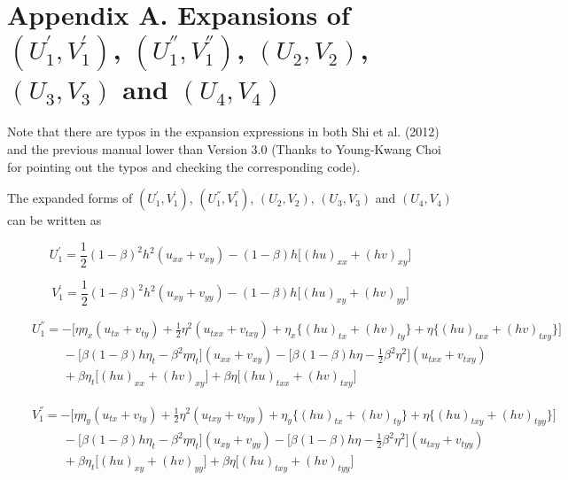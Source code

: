 \documentclass[11pt]{article}
\begin{document}
\newpage

\section{Appendix A. Expansions of $(U_1^{'},V_1^{'})$, $(U_1^{''},V_1^{''})$, $(U_2,V_2)$, $(U_3,V_3)$ and $(U_4,V_4)$ }

Note that there are typos in the expansion expressions  in both Shi et al. (2012) and the previous manual lower than Version 3.0 (Thanks to Young-Kwang Choi for pointing out the typos and checking the corresponding code). 

The expanded forms of $(U_1^{'},V_1^{'})$, $(U_1^{''},V_1^{''})$, $(U_2,V_2)$, $(U_3,V_3)$ and $(U_4,V_4)$ can be written as

\begin{equation}
U_1^{'}=\frac{1}{2}(1-\beta)^2 h^2 (u_{xx} + v_{xy}) - (1-\beta)h \big[ (hu)_{xx} + (hv)_{xy} \big]
\end{equation}

\begin{equation}
V_1^{'}=\frac{1}{2}(1-\beta)^2 h^2 (u_{xy} + v_{yy}) - (1-\beta)h \big[ (hu)_{xy} + (hv)_{yy} \big]
\end{equation}

\begin{eqnarray}
&&U_1^{''}=-\bigg[
         \eta \eta_x (u_{tx}+v_{ty}) + \frac{1}{2} \eta^2 ( u_{txx}+v_{txy} )
         + \eta_x \Big\{ (hu)_{tx} + (hv)_{ty} \Big\}
         + \eta \Big\{ (hu)_{txx} + (hv)_{txy} \Big\}
          \bigg]
         \nonumber \\
&& \quad \quad \,\,\,
         - \Big[ \beta(1-\beta) h \eta_t - \beta^2 \eta \eta_t \Big] (u_{xx}+v_{xy})
         - \Big[ \beta(1-\beta) h \eta - \frac{1}{2} \beta^2 \eta^2 \Big]
         ( u_{txx} + v_{txy} )
         \nonumber \\
&& \quad \quad \,\,\,
         + \beta \eta_t \Big[ (hu)_{xx} + (hv)_{xy} \Big]
         + \beta \eta \Big[ (hu)_{txx} + (hv)_{txy} \Big]
\end{eqnarray}

\begin{eqnarray}
&&V_1^{''}=-\bigg[
         \eta \eta_y (u_{tx}+v_{ty}) + \frac{1}{2} \eta^2 ( u_{txy}+v_{tyy} )
         + \eta_y \Big\{ (hu)_{tx} + (hv)_{ty} \Big\}
         + \eta \Big\{ (hu)_{txy} + (hv)_{tyy} \Big\}
          \bigg]
         \nonumber \\
&& \quad \quad \,\,\,
         - \Big[ \beta(1-\beta) h \eta_t - \beta^2 \eta \eta_t \Big] (u_{xy}+v_{yy})
         - \Big[ \beta(1-\beta) h \eta - \frac{1}{2} \beta^2 \eta^2 \Big]
         ( u_{txy} + v_{tyy} )
         \nonumber \\
&& \quad \quad \,\,\,
         + \beta \eta_t \Big[ (hu)_{xy} + (hv)_{yy} \Big]
         + \beta \eta \Big[ (hu)_{txy} + (hv)_{tyy} \Big]
\end{eqnarray}
\end{document}
